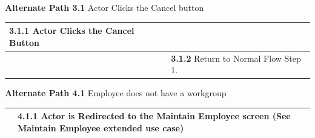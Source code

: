 \documentclass[letterpaper,12pt]{report}
\begin{document}
{\centering \textbf{Alternate Path 3.1}
\linebreak {}Actor Clicks the Cancel button
\begin{center}
\xuchead
\begin{tabular}{| p{8.5cm} | p{8.5cm} |}
\hline
\textbf{3.1.1} \index{actor}Actor Clicks the Cancel Button & \\
\hline
& \textbf{3.1.2} Return to Normal Flow Step 1. \\
\hline
\end{tabular}
\end{center}
\pagebreak
\centering \textbf{Alternate Path 4.1}
\linebreak Employee does not have a workgroup
\begin{center}
\xuchead
\begin{tabular}{| p{8.5cm} | p{8.5cm} |}
\hline
& \textbf{4.1.1} \index{actor}Actor is Redirected to the Maintain Employee screen (See Maintain Employee extended use case\index{Use Case})  \\
\hline
\end{tabular}
\end{center}
}
\pagebreak
\end{document}
